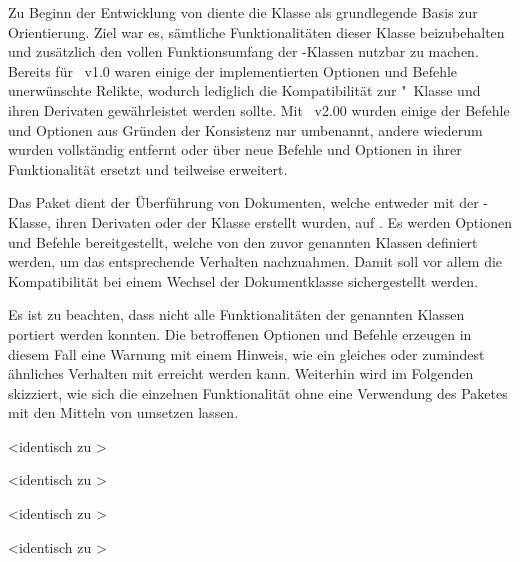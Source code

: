 \begin{DeclareEntity}{}
Zu Beginn der Entwicklung von \TUDScript diente die Klasse  als 
grundlegende Basis zur Orientierung. Ziel war es, sämtliche Funktionalitäten 
dieser Klasse beizubehalten und zusätzlich den vollen Funktionsumfang der 
\KOMAScript-Klassen nutzbar zu machen. Bereits für \TUDScript~v1.0 waren einige 
der implementierten Optionen und Befehle unerwünschte Relikte, wodurch 
lediglich die Kompatibilität zur "~Klasse und ihren 
Derivaten gewährleistet werden sollte. Mit \TUDScript~v2.00 wurden einige der 
Befehle und Optionen aus Gründen der Konsistenz nur umbenannt, andere wiederum 
wurden vollständig entfernt oder über neue Befehle und Optionen in ihrer 
Funktionalität ersetzt und teilweise erweitert. 

Das Paket  dient der Überführung von Dokumenten, welche
entweder mit der -Klasse, ihren Derivaten oder der Klasse 
 erstellt wurden, auf \vTUDScript*{\TUDScript}. Es
werden Optionen und Befehle bereitgestellt, welche von den zuvor genannten 
Klassen definiert werden, um das entsprechende Verhalten nachzuahmen. Damit 
soll vor allem die Kompatibilität bei einem Wechsel der Dokumentklasse 
sichergestellt werden.
%
\begin{quoting}
\end{quoting}
%
Es ist zu beachten, dass nicht alle Funktionalitäten der genannten Klassen 
portiert werden konnten. Die betroffenen Optionen und Befehle erzeugen in 
diesem Fall eine Warnung mit einem Hinweis, wie ein gleiches oder zumindest 
ähnliches Verhalten mit \TUDScript erreicht werden kann. Weiterhin wird im 
Folgenden skizziert, wie sich die einzelnen Funktionalität ohne eine Verwendung 
des Paketes  mit den Mitteln von \TUDScript umsetzen 
lassen. 

\begin{Declaration}
  {}
  <identisch zu >
\begin{Declaration}
  {}
  <identisch zu >
\begin{Declaration}
  {}
  <identisch zu >
\begin{Declaration}
  {}
  <identisch zu >
\printdeclarationlist


\end{Declaration}
\end{Declaration}
\end{Declaration}
\end{Declaration}
\end{DeclareEntity}
